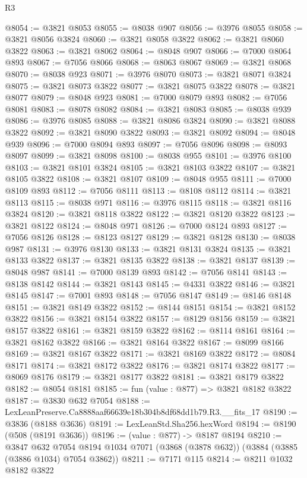 \begin{lexlean}{R3}
\begin{coremodule}
@8054 := @3821 @8053
@8055 := @8038 @907
@8056 := @3976 @8055
@8058 := @3821 @8056 @3824
@8060 := @3821 @8058 @3822
@8062 := @3821 @8060 @3822
@8063 := @3821 @8062
@8064 := @8048 @907
@8066 := @7000 @8064 @893
@8067 := @7056 @8066
@8068 := @8063 @8067
@8069 := @3821 @8068
@8070 := @8038 @923
@8071 := @3976 @8070
@8073 := @3821 @8071 @3824
@8075 := @3821 @8073 @3822
@8077 := @3821 @8075 @3822
@8078 := @3821 @8077
@8079 := @8048 @923
@8081 := @7000 @8079 @893
@8082 := @7056 @8081
@8083 := @8078 @8082
@8084 := @3821 @8083
@8085 := @8038 @939
@8086 := @3976 @8085
@8088 := @3821 @8086 @3824
@8090 := @3821 @8088 @3822
@8092 := @3821 @8090 @3822
@8093 := @3821 @8092
@8094 := @8048 @939
@8096 := @7000 @8094 @893
@8097 := @7056 @8096
@8098 := @8093 @8097
@8099 := @3821 @8098
@8100 := @8038 @955
@8101 := @3976 @8100
@8103 := @3821 @8101 @3824
@8105 := @3821 @8103 @3822
@8107 := @3821 @8105 @3822
@8108 := @3821 @8107
@8109 := @8048 @955
@8111 := @7000 @8109 @893
@8112 := @7056 @8111
@8113 := @8108 @8112
@8114 := @3821 @8113
@8115 := @8038 @971
@8116 := @3976 @8115
@8118 := @3821 @8116 @3824
@8120 := @3821 @8118 @3822
@8122 := @3821 @8120 @3822
@8123 := @3821 @8122
@8124 := @8048 @971
@8126 := @7000 @8124 @893
@8127 := @7056 @8126
@8128 := @8123 @8127
@8129 := @3821 @8128
@8130 := @8038 @987
@8131 := @3976 @8130
@8133 := @3821 @8131 @3824
@8135 := @3821 @8133 @3822
@8137 := @3821 @8135 @3822
@8138 := @3821 @8137
@8139 := @8048 @987
@8141 := @7000 @8139 @893
@8142 := @7056 @8141
@8143 := @8138 @8142
@8144 := @3821 @8143
@8145 := @4331 @3822
@8146 := @3821 @8145
@8147 := @7001 @893
@8148 := @7056 @8147
@8149 := @8146 @8148
@8151 := @3821 @8149 @3822
@8152 := @8144 @8151
@8154 := @3821 @8152 @3822
@8156 := @3821 @8154 @3822
@8157 := @8129 @8156
@8159 := @3821 @8157 @3822
@8161 := @3821 @8159 @3822
@8162 := @8114 @8161
@8164 := @3821 @8162 @3822
@8166 := @3821 @8164 @3822
@8167 := @8099 @8166
@8169 := @3821 @8167 @3822
@8171 := @3821 @8169 @3822
@8172 := @8084 @8171
@8174 := @3821 @8172 @3822
@8176 := @3821 @8174 @3822
@8177 := @8069 @8176
@8179 := @3821 @8177 @3822
@8181 := @3821 @8179 @3822
@8182 := @8054 @8181
@8185 := fun (value : @877) => @3821 @8182 @3822
@8187 := @3830 @632 @7054
@8188 := LexLeanPreserve.Ca8888aaf66639e18b304b8df68dd1b79.R3.__fits_17
@8190 := @3836 (@8188 @3636)
@8191 := LexLeanStd.Sha256.hexWord
@8194 := @8190 (@508 (@8191 @3636))
@8196 := (value : @877) -> @8187 @8194
@8210 := @3847
    @632
    @7054
    @8194
    @1034
    @7071
    (@3868 (@3878 @632))
    (@3884 (@3885 (@3886 @1034) @7054 @3862))
@8211 := @7171 @115
@8214 := @8211 @1032 @8182 @3822

\end{coremodule}
\end{lexlean}
